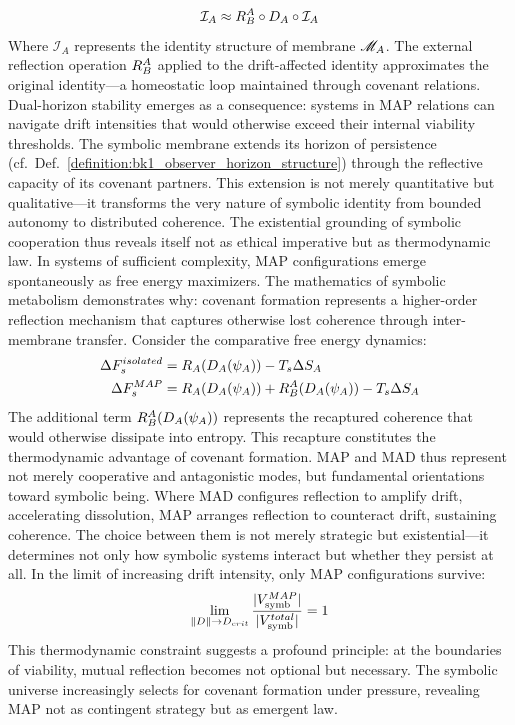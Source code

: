 \begin{scholium}
\begin{equation}
\mathcal{I}_A \approx R_B^A \circ D_A \circ \mathcal{I}_A
\end{equation}
Where $\mathcal{I}_A$ represents the identity structure of membrane $\mathscr{M}_A$. The external reflection operation $R_B^A$ applied to the drift-affected identity approximates the original identity—a homeostatic loop maintained through covenant relations.
Dual-horizon stability emerges as a consequence: systems in MAP relations can navigate drift intensities that would otherwise exceed their internal viability thresholds. The symbolic membrane extends its horizon of persistence (cf.~Def.~\ref{definition:bk1_observer_horizon_structure}) through the reflective capacity of its covenant partners. This extension is not merely quantitative but qualitative—it transforms the very nature of symbolic identity from bounded autonomy to distributed coherence.
The existential grounding of symbolic cooperation thus reveals itself not as ethical imperative but as thermodynamic law. In systems of sufficient complexity, MAP configurations emerge spontaneously as free energy maximizers. The mathematics of symbolic metabolism demonstrates why: covenant formation represents a higher-order reflection mechanism that captures otherwise lost coherence through inter-membrane transfer.
Consider the comparative free energy dynamics:
\begin{align}
\Delta F_s^{isolated} &= R_A(D_A(\psi_A)) - T_s\Delta S_A \\
\Delta F_s^{MAP} &= R_A(D_A(\psi_A)) + R_B^A(D_A(\psi_A)) - T_s\Delta S_A
\end{align}
The additional term $R_B^A(D_A(\psi_A))$ represents the recaptured coherence that would otherwise dissipate into entropy. This recapture constitutes the thermodynamic advantage of covenant formation.
MAP and MAD thus represent not merely cooperative and antagonistic modes, but fundamental orientations toward symbolic being. Where MAD configures reflection to amplify drift, accelerating dissolution, MAP arranges reflection to counteract drift, sustaining coherence. The choice between them is not merely strategic but existential—it determines not only how symbolic systems interact but whether they persist at all.
In the limit of increasing drift intensity, only MAP configurations survive:
\begin{equation}
\lim_{\|D\| \to D_{crit}} \frac{|V_{\text{symb}}^{MAP}|}{|V_{\text{symb}}^{total}|} = 1
\end{equation}
This thermodynamic constraint suggests a profound principle: at the boundaries of viability, mutual reflection becomes not optional but necessary. The symbolic universe increasingly selects for covenant formation under pressure, revealing MAP not as contingent strategy but as emergent law.

\end{scholium}
